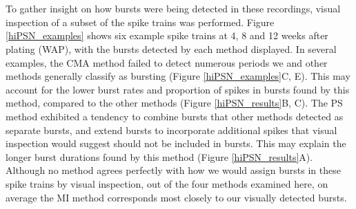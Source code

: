\documentclass[12pt, titlepage]{article}
\begin{document}
	\\ \\ To gather insight on how bursts were being detected in these recordings, visual inspection of a subset of the spike trains was performed.  Figure \ref{hiPSN_examples} shows six example spike trains at 4, 8 and 12 weeks after plating (WAP), with the bursts detected by each method displayed. In several examples, the CMA method failed to detect numerous periods we and other methods generally classify as bursting (Figure \ref{hiPSN_examples}C, E). This may account for the lower burst rates and proportion of spikes in bursts found by this method, compared to the other methods (Figure \ref{hiPSN_results}B, C). The PS method exhibited a tendency to combine bursts that other methods detected as separate bursts, and extend bursts to incorporate additional spikes that visual inspection would suggest should not be included in bursts. This may explain the longer burst durations found by this method (Figure \ref{hiPSN_results}A). Although no method agrees perfectly with how we would assign bursts in these spike trains by visual inspection, out of the four methods examined here, on average the MI method corresponds most closely to our visually detected bursts. 
\end{document}
